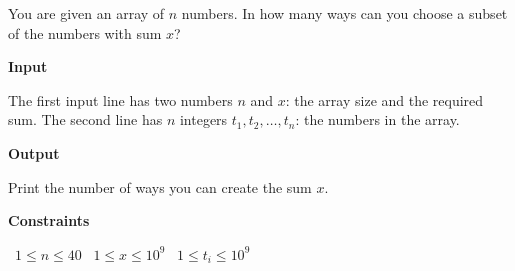 You are given an array of $n$ numbers. In how many ways can you choose a subset of the numbers with sum $x$?

\vspace{0.3cm}\noindent\textbf{Input}

The first input line has two numbers $n$ and $x$: the array size and the required sum.
The second line has $n$ integers $t_1,t_2,\dots,t_n$: the numbers in the array.

\vspace{0.3cm}\noindent\textbf{Output}

Print the number of ways you can create the sum $x$.

\vspace{0.3cm}\noindent\textbf{Constraints}

\textbullet\ $1 \le n \le 40$
\textbullet\ $1 \le x \le 10^9$
\textbullet\ $1 \le t_i \le 10^9$